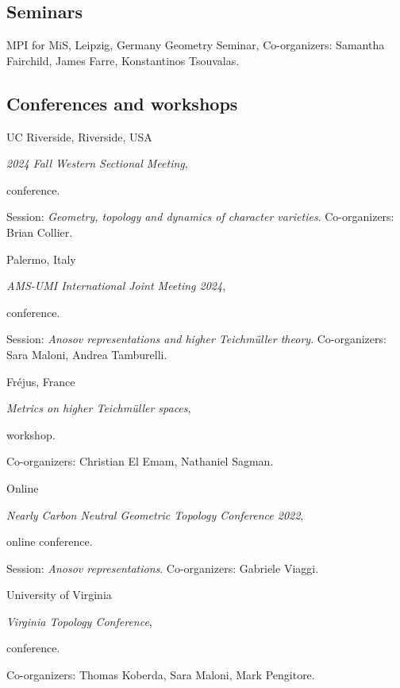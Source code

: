 
\subsection{Seminars}

{MPI for MiS, Leipzig, Germany}
{Geometry Seminar,}
{Co-organizers: Samantha Fairchild, James Farre, Konstantinos Tsouvalas.}

\subsection{Conferences and workshops}

{UC Riverside, Riverside, USA}
{\emph{2024 Fall Western Sectional Meeting}, \begin{footnotesize}
		conference.
\end{footnotesize}}
{Session: \emph{Geometry, topology and dynamics of character varieties}. Co-organizers: Brian Collier.}

{Palermo, Italy}
{\emph{ AMS-UMI International Joint Meeting 2024}, \begin{footnotesize}
		conference.
\end{footnotesize}}
{Session: \emph{Anosov representations and higher Teichm\"uller theory}. Co-organizers: Sara Maloni, Andrea Tamburelli.}

{Fr\'ejus, France}
{\emph{Metrics on higher Teichm\"uller spaces}, \begin{footnotesize}
		workshop.
\end{footnotesize}}
{Co-organizers: Christian El Emam, Nathaniel Sagman.}

{Online}
{\emph{Nearly Carbon Neutral Geometric Topology Conference 2022}, \begin{footnotesize}
		online conference.
\end{footnotesize}}
{Session: \emph{Anosov representations}. Co-organizers: Gabriele Viaggi.}

{University of Virginia}
{\emph{Virginia Topology Conference}, \begin{footnotesize}
		conference.
\end{footnotesize}}
{Co-organizers: Thomas Koberda, Sara Maloni, Mark Pengitore.}
%